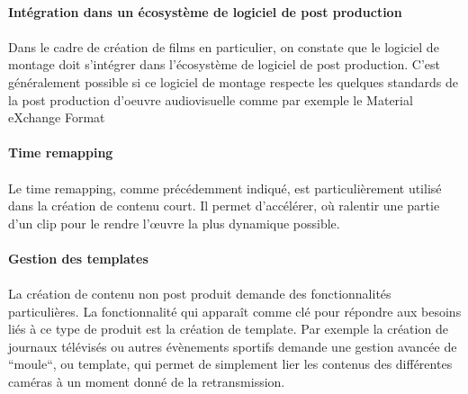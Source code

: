 \paragraph{Intégration dans un écosystème de logiciel de post
production}

\paragraph{}

Dans le cadre de création de films en particulier, on constate que le
logiciel de montage doit s'intégrer dans l'écosystème de logiciel
de post production. C'est généralement possible si ce logiciel
de montage respecte les quelques standards de la post production
d'oeuvre audiovisuelle comme par exemple le Material eXchange Format
 

\paragraph{Time remapping}

\paragraph{ }

Le time remapping, comme précédemment indiqué, est particulièrement
utilisé dans la création de contenu court. Il permet d'accélérer,
où ralentir une partie d'un clip pour le rendre l'œuvre la plus
dynamique possible.

\paragraph{Gestion des templates}

\paragraph{ }

La création de contenu non post produit demande des fonctionnalités
particulières. La fonctionnalité qui apparaît comme clé pour répondre
aux besoins liés à ce type de produit est la création de template. Par
exemple la création de journaux télévisés ou autres évènements
sportifs demande une gestion avancée de ``moule``, ou template, qui
permet de simplement lier les contenus des différentes caméras à un
moment donné de la retransmission.


